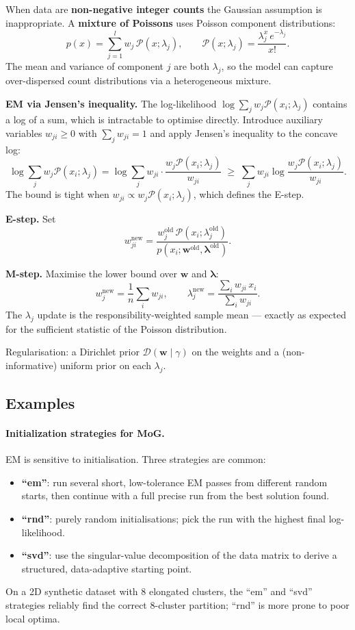 \documentclass[11pt, oneside]{book}
\begin{document}
When data are \textbf{non-negative integer counts} the Gaussian assumption
is inappropriate.
A \textbf{mixture of Poissons} uses Poisson component distributions:
\[
  p(x) = \sum_{j=1}^{l} w_j\,\mathcal{P}(x;\lambda_j),
  \qquad
  \mathcal{P}(x;\lambda_j) = \frac{\lambda_j^x\,e^{-\lambda_j}}{x!}.
\]
The mean and variance of component $j$ are both $\lambda_j$, so the model
can capture over-dispersed count distributions via a heterogeneous mixture.

\textbf{EM via Jensen's inequality.}
The log-likelihood $\log\sum_j w_j\mathcal{P}(x_i;\lambda_j)$ contains a log
of a sum, which is intractable to optimise directly.
Introduce auxiliary variables $w_{ji}\geq 0$ with $\sum_j w_{ji}=1$
and apply Jensen's inequality to the concave log:
\[
  \log\sum_j w_j\mathcal{P}(x_i;\lambda_j)
  = \log\sum_j w_{ji}\cdot\frac{w_j\mathcal{P}(x_i;\lambda_j)}{w_{ji}}
  \;\geq\; \sum_j w_{ji}\log\frac{w_j\mathcal{P}(x_i;\lambda_j)}{w_{ji}}.
\]
The bound is tight when $w_{ji} \propto w_j\mathcal{P}(x_i;\lambda_j)$,
which defines the E-step.

\textbf{E-step.} Set
\[
  w_{ji}^{\text{new}}
  = \frac{w_j^{\text{old}}\,\mathcal{P}(x_i;\lambda_j^{\text{old}})}
         {p(x_i;\bm{w}^{\text{old}},\bm{\lambda}^{\text{old}})}.
\]

\textbf{M-step.} Maximise the lower bound over $\bm{w}$ and $\bm{\lambda}$:
\[
  w_j^{\text{new}} = \frac{1}{n}\sum_i w_{ji},
  \qquad
  \lambda_j^{\text{new}} = \frac{\displaystyle\sum_i w_{ji}\,x_i}
                                 {\displaystyle\sum_i w_{ji}}.
\]
The $\lambda_j$ update is the responsibility-weighted sample mean —
exactly as expected for the sufficient statistic of the Poisson distribution.

Regularisation: a Dirichlet prior $\mathcal{D}(\bm{w}\mid\gamma)$ on the
weights and a (non-informative) uniform prior on each $\lambda_j$.

\subsection{Examples}

\paragraph{Initialization strategies for MoG.}
EM is sensitive to initialisation.
Three strategies are common:
\begin{itemize}
  \item \textbf{``em''}: run several short, low-tolerance EM passes from
        different random starts, then continue with a full precise run from
        the best solution found.
  \item \textbf{``rnd''}: purely random initialisations; pick the run with
        the highest final log-likelihood.
  \item \textbf{``svd''}: use the singular-value decomposition of the data
        matrix to derive a structured, data-adaptive starting point.
\end{itemize}
On a 2D synthetic dataset with 8 elongated clusters, the ``em'' and ``svd''
strategies reliably find the correct 8-cluster partition;
``rnd'' is more prone to poor local optima.
\end{document}
